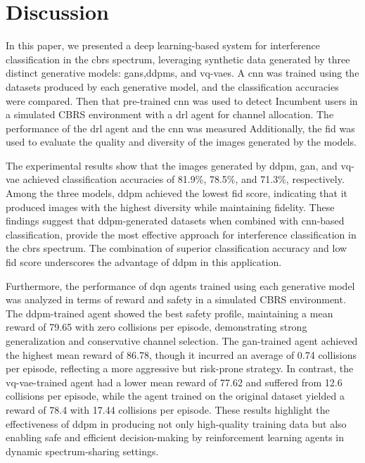 \chapter{Discussion}
\label{chap:discussion}

In this paper, we presented a deep learning-based system for interference classification in the \gls{cbrs} spectrum, leveraging synthetic data generated by three distinct generative models: \gls{gan}s,\gls{ddpm}s, and \gls{vq-vae}s. A \gls{cnn} was trained using the datasets produced by each generative model, and the classification accuracies were compared. Then that pre-trained \gls{cnn} was used to detect Incumbent users in a simulated CBRS environment with a \gls{drl} agent for channel allocation. The performance of the \gls{drl} agent and the \gls{cnn} was measured Additionally, the \gls{fid} was used to evaluate the quality and diversity of the images generated by the models.  

The experimental results show that the images generated by \gls{ddpm}, \gls{gan}, and \gls{vq-vae} achieved classification accuracies of 81.9\%, 78.5\%, and 71.3\%, respectively. Among the three models, \gls{ddpm} achieved the lowest \gls{fid} score, indicating that it produced images with the highest diversity while maintaining fidelity. These findings suggest that \gls{ddpm}-generated datasets when combined with \gls{cnn}-based classification, provide the most effective approach for interference classification in the \gls{cbrs} spectrum. The combination of superior classification accuracy and low \gls{fid} score underscores the advantage of \gls{ddpm} in this application.  

Furthermore, the performance of \gls{dqn} agents trained using each generative model was analyzed in terms of reward and safety in a simulated CBRS environment. The \gls{ddpm}-trained agent showed the best safety profile, maintaining a mean reward of 79.65 with zero collisions per episode, demonstrating strong generalization and conservative channel selection. The \gls{gan}-trained agent achieved the highest mean reward of 86.78, though it incurred an average of 0.74 collisions per episode, reflecting a more aggressive but risk-prone strategy. In contrast, the \gls{vq-vae}-trained agent had a lower mean reward of 77.62 and suffered from 12.6 collisions per episode, while the agent trained on the original dataset yielded a reward of 78.4 with 17.44 collisions per episode. These results highlight the effectiveness of \gls{ddpm} in producing not only high-quality training data but also enabling safe and efficient decision-making by reinforcement learning agents in dynamic spectrum-sharing settings.

